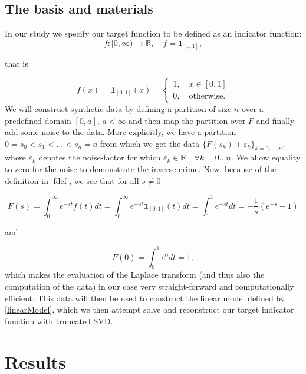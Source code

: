 \documentclass[12pt,a4]{article}
\newcommand{\R}{{\mathbb R}}
\newcommand{\lra}{\longrightarrow}
\newcommand{\ind}{{\mathbf{1}}}
\begin{document}
\subsection{The basis and materials}\label{sec:basis}

In our study we specify our target function to be defined as an indicator function:
\begin{equation}\label{fdef}
f:[0,\infty) \lra \R, \quad f = \ind_{[0,1]},
\end{equation}

that is

\begin{equation*}
f(x) = \ind_{[0,1]}(x)=
\begin{cases}
    1, \quad x \in [0,1]\\
    0, \quad \text{otherwise}.
\end{cases}
\end{equation*}
We will construct synthetic data by defining a partition of size $n$ over a predefined domain $[0,a]$, $a < \infty$ and then map the partition over $F$ and finally add some noise to the data. More explicitly, we have a partition $0=s_0 < s_1 < \ldots <s_n = a$ from which we get the data 
$\{F(s_k) + \varepsilon_k\}_{k = 0, \ldots, n}$, where $\varepsilon_k$ denotes the noise-factor for which $\varepsilon_k \in \R \quad \forall k=0 \ldots n$. We allow equality to zero for the noise to demonstrate the inverse crime. Now, because of the definition in \eqref{fdef}, we see that for all $s \neq 0$  

\begin{equation*}
F(s) = \int_0^\infty e^{-st}f(t)dt 
     = \int_0^\infty e^{-st}\ind_{[0,1]}(t)dt
     = \int_0^1 e^{-st}dt
     = -\frac{1}{s}\left(e^{-s} - 1\right)
\end{equation*}

and

\begin{equation*}
F(0) = \int_0^1 e^{0}dt = 1,
\end{equation*}
which makes the evaluation of the Laplace transform (and thus also the computation of the data) in our case very straight-forward and computationally efficient. This data will then be used to construct the linear model defined by \eqref{linearModel}, which we then attempt solve and reconstruct our target indicator function with truncated SVD.

\section{Results}\label{sec:results}
\end{document}
